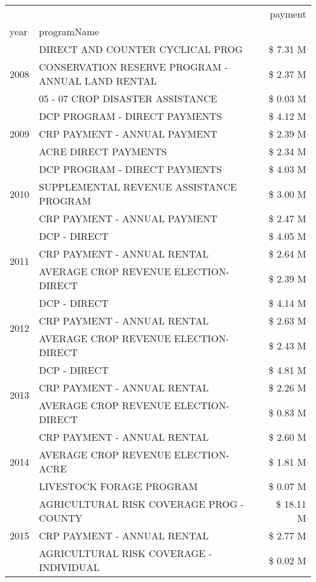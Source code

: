 \begin{tabular}{llr}
\toprule
 &  & payment \\
year & programName &  \\
\midrule
\multirow[t]{3}{*}{2008} & DIRECT AND COUNTER CYCLICAL PROG & \$ 7.31 M \\
 & CONSERVATION RESERVE PROGRAM - ANNUAL LAND RENTAL & \$ 2.37 M \\
 & 05 - 07 CROP DISASTER ASSISTANCE & \$ 0.03 M \\
\cline{1-3}
\multirow[t]{3}{*}{2009} & DCP PROGRAM - DIRECT PAYMENTS & \$ 4.12 M \\
 & CRP PAYMENT - ANNUAL PAYMENT & \$ 2.39 M \\
 & ACRE DIRECT PAYMENTS & \$ 2.34 M \\
\cline{1-3}
\multirow[t]{3}{*}{2010} & DCP PROGRAM - DIRECT PAYMENTS & \$ 4.03 M \\
 & SUPPLEMENTAL REVENUE ASSISTANCE PROGRAM & \$ 3.00 M \\
 & CRP PAYMENT - ANNUAL PAYMENT & \$ 2.47 M \\
\cline{1-3}
\multirow[t]{3}{*}{2011} & DCP - DIRECT & \$ 4.05 M \\
 & CRP PAYMENT - ANNUAL RENTAL & \$ 2.64 M \\
 & AVERAGE CROP REVENUE ELECTION-DIRECT & \$ 2.39 M \\
\cline{1-3}
\multirow[t]{3}{*}{2012} & DCP - DIRECT & \$ 4.14 M \\
 & CRP PAYMENT - ANNUAL RENTAL & \$ 2.63 M \\
 & AVERAGE CROP REVENUE ELECTION-DIRECT & \$ 2.43 M \\
\cline{1-3}
\multirow[t]{3}{*}{2013} & DCP - DIRECT & \$ 4.81 M \\
 & CRP PAYMENT - ANNUAL RENTAL & \$ 2.26 M \\
 & AVERAGE CROP REVENUE ELECTION-DIRECT & \$ 0.83 M \\
\cline{1-3}
\multirow[t]{3}{*}{2014} & CRP PAYMENT - ANNUAL RENTAL & \$ 2.60 M \\
 & AVERAGE CROP REVENUE ELECTION-ACRE & \$ 1.81 M \\
 & LIVESTOCK FORAGE PROGRAM & \$ 0.07 M \\
\cline{1-3}
\multirow[t]{3}{*}{2015} & AGRICULTURAL RISK COVERAGE PROG - COUNTY & \$ 18.11 M \\
 & CRP PAYMENT - ANNUAL RENTAL & \$ 2.77 M \\
 & AGRICULTURAL RISK COVERAGE - INDIVIDUAL & \$ 0.02 M \\
\cline{1-3}

\end{tabular}
